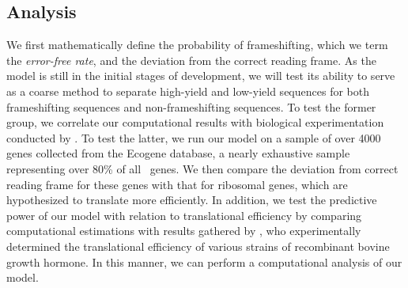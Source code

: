 \documentclass[article, oneside]{memoir}
\begin{document}
\subsection{Analysis}
We first mathematically define the probability of frameshifting, which
we term the \emph{error-free rate}, and the deviation from the correct
reading frame. As the model is still in the initial stages of
development, we will test its ability to serve as a coarse method to
separate high-yield and low-yield sequences for both frameshifting
sequences and non-frameshifting sequences. To test the former group,
we correlate our computational results with biological experimentation
conducted by \citet{weiss87}. To test the latter, we run our model on
a sample of over 4000 genes collected from the Ecogene database, a
nearly exhaustive sample representing over 80\% of all \ecoli\ genes.
We then compare the deviation from correct reading frame for these
genes with that for ribosomal genes, which are hypothesized to
translate more efficiently. In addition, we test the predictive power
of our model with relation to translational efficiency by comparing
computational estimations with results gathered by
\citet{schoner:bgh}, who experimentally determined the translational
efficiency of various strains of recombinant bovine growth hormone. In
this manner, we can perform a computational analysis of our model.

{}

\end{document}
